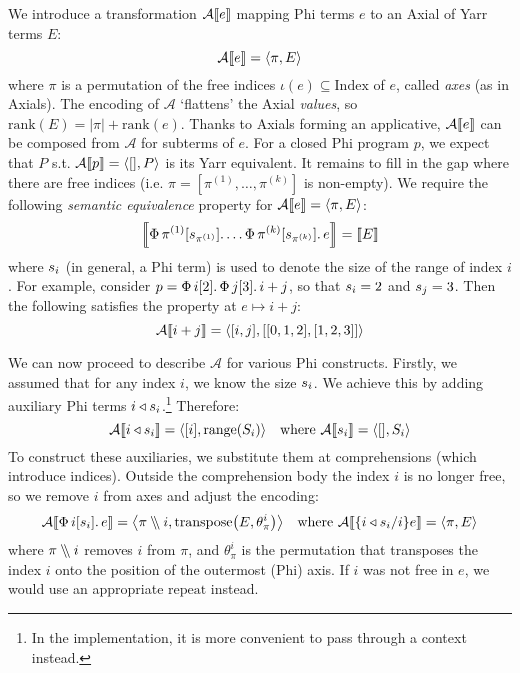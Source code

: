 We introduce a transformation $\mathcal A \denot{e}$ mapping Phi terms $e$ to an Axial of Yarr terms $E$:
$$ \mathcal A \denot{e} = \langle \pi, E \rangle $$
where $\pi$ is a permutation of the free indices $\iota(e) \subseteq \mathrm{Index}$ of $e$, called \textit{axes} (as in Axials). The encoding of $\mathcal A$ `flattens' the Axial \textit{values}, so $\mathrm{rank}(E) = |\pi| + \mathrm{rank}(e)$. Thanks to Axials forming an applicative, $\mathcal A \denot{e}$ can be composed from $\mathcal A$ for subterms of $e$. 
For a closed Phi program $p$, we expect that $P$ s.t. $\mathcal A \denot{p} = \phipair{[]}{P}$ is its Yarr equivalent. It remains to fill in the gap where there are free indices (i.e. $\pi = \left[ \pi^{(1)}, \dots, \pi^{(k)} \right]$ is non-empty). We require the following \textit{semantic equivalence} property for $\mathcal A \denot e = \phipair{\pi}{E}$:
$$ \denot{\phivec{\pi^{(1)}}{\sizeat{\pi^{(1)}}}{\dots \phivec{\pi^{(k)}}{\sizeat{\pi^{(k)}}}{e}}} = \denot{E}$$
where $s_{i}$ (in general, a Phi term) is used to denote the size of the range of index $i$. For example, consider $p = \Phi\, {i}[{2}] \ldotp {\Phi\, {j}[{3}] \ldotp {i + j}}$, so that $s_{i} = 2$ and $s_{j} = 3$. Then the following satisfies the property at $e \mapsto i + j$:
$$ \mathcal A \denot{i + j} = \phipair{[i, j]}{[[0, 1, 2], [1, 2, 3]]} $$

\newcommand{\sized}[1]{{#1} \triangleleft \sizeat{#1}}
We can now proceed to describe $\mathcal A$ for various Phi constructs. Firstly, we assumed that for any index $i$, we know the size $s_{i}$. We achieve this by adding auxiliary Phi terms $\sized i$.\footnote{In the implementation, it is more convenient to pass through a context instead.} Therefore:
$$ \mathcal A \denot{i \triangleleft \sizeat{i}} 
= \phipair{[i]}{ \mathrm{range} \left( \altsizeat{i} \right) }
\quad 
\text{where } \mathcal A \denot{\sizeat{i}} = \phipair{[]}{\altsizeat{i}} $$
To construct these auxiliaries, we substitute them at comprehensions (which introduce indices). Outside the comprehension body the index $i$ is no longer free, so we  remove $i$ from axes and adjust the encoding:
\newcommand{\dblsetminus}{\mathbin{{\setminus}\mspace{-5mu}{\setminus}}}
$$
\mathcal A \denot{\phivec{i}{\sizeat i}{e}} 
= \phipair{\mathcal \pi \dblsetminus i}{
\mathrm{transpose} \left( E, \theta_\pi^i \right)} 
\quad
\text{where } \mathcal A \denot{\{\sized i / i\} e} 
= \phipair{\pi}{E}
$$
where $\pi \dblsetminus i$ removes $i$ from $\pi$, and $\theta_\pi^i$ is the permutation that transposes the index $i$ onto the position of the outermost (Phi) axis. 
If $i$ was not free in $e$, we would use an appropriate $\mathrm{repeat}$ instead.

